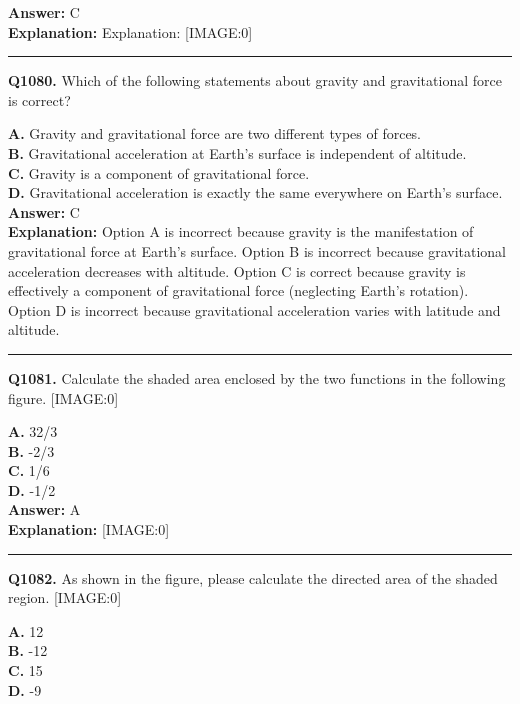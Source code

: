 \documentclass[12pt]{article}
\begin{document}
\textbf{Answer:} C \\
\textbf{Explanation:} Explanation:
[IMAGE:0]

\hrule
\vspace{1em}


\noindent
\textbf{Q1080.} Which of the following statements about gravity and gravitational force is correct?



\textbf{A.} Gravity and gravitational force are two different types of forces. \\
\textbf{B.} Gravitational acceleration at Earth's surface is independent of altitude. \\
\textbf{C.} Gravity is a component of gravitational force. \\
\textbf{D.} Gravitational acceleration is exactly the same everywhere on Earth's surface. \\

\textbf{Answer:} C \\
\textbf{Explanation:} Option A is incorrect because gravity is the manifestation of gravitational force at Earth's surface. Option B is incorrect because gravitational acceleration decreases with altitude. Option C is correct because gravity is effectively a component of gravitational force (neglecting Earth's rotation). Option D is incorrect because gravitational acceleration varies with latitude and altitude.

\hrule
\vspace{1em}


\noindent
\textbf{Q1081.} Calculate the shaded area enclosed by the two functions in the following figure.
[IMAGE:0]



\textbf{A.} 32/3 \\
\textbf{B.} -2/3 \\
\textbf{C.} 1/6 \\
\textbf{D.} -1/2 \\

\textbf{Answer:} A \\
\textbf{Explanation:} [IMAGE:0]

\hrule
\vspace{1em}


\noindent
\textbf{Q1082.} As shown in the figure, please calculate the directed area of the shaded region.
[IMAGE:0]



\textbf{A.} 12 \\
\textbf{B.} -12 \\
\textbf{C.} 15 \\
\textbf{D.} -9 \\
\end{document}
